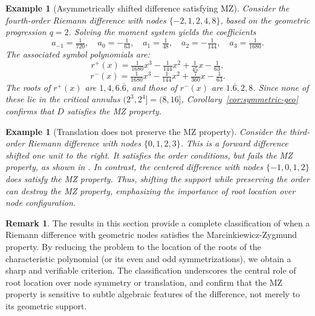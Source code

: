 \documentclass{raex}
\newtheorem{example}[theorem]{Example}
\theoremstyle{definition}
\newtheorem{remark}[theorem]{Remark}
\begin{document}
\begin{example}[Asymmetrically shifted difference satisfying MZ]
Consider the fourth-order Riemann difference with nodes \( \{-2, 1, 2, 4, 8\} \), based on the geometric progression \( q = 2 \). Solving the moment system yields the coefficients
\[
a_{-1} = \tfrac{1}{720}, \quad a_0 = -\tfrac{1}{63}, \quad a_1 = \tfrac{1}{48}, \quad a_2 = -\tfrac{1}{144}, \quad a_3 = \tfrac{1}{1680}.
\]
The associated symbol polynomials are:
\[
r^+(x) = \tfrac{1}{1680}x^3 - \tfrac{1}{144}x^2 + \tfrac{1}{45}x - \tfrac{1}{63},
\]
\[
r^-(x) = \tfrac{1}{1680}x^3 - \tfrac{1}{144}x^2 + \tfrac{7}{360}x - \tfrac{1}{63}.
\]
The roots of \( r^+(x) \) are \( 1, 4, 6.\overline{6} \), and those of \( r^-(x) \) are \( 1.\overline{6}, 2, 8 \). Since none of these lie in the critical annulus \( (2^3, 2^4] = (8, 16] \), Corollary~\ref{cor:symmetric-geo} confirms that \( D \) satisfies the MZ property.
\end{example}

\begin{example}[Translation does not preserve the MZ property]
Consider the third-order Riemann difference with nodes \( \{0, 1, 2, 3\} \). This is a forward difference shifted one unit to the right. It satisfies the order conditions, but fails the MZ property, as shown in \cite{ACF}. In contrast, the centered difference with nodes \( \{-1, 0, 1, 2\} \) does satisfy the MZ property. Thus, shifting the support while preserving the order can destroy the MZ property, emphasizing the importance of root location over node configuration.
\end{example}
\begin{remark}
The results in this section provide a complete classification of when a Riemann difference with geometric nodes satisfies the Marcinkiewicz-Zygmund property. By reducing the problem to the location of the roots of the characteristic polynomial (or its even and odd symmetrizations), we obtain a sharp and verifiable criterion. The classification underscores the central role of root location over node symmetry or translation, and confirm that the MZ property is sensitive to subtle algebraic features of the difference, not merely to its geometric support.
\end{remark}

\end{document}
